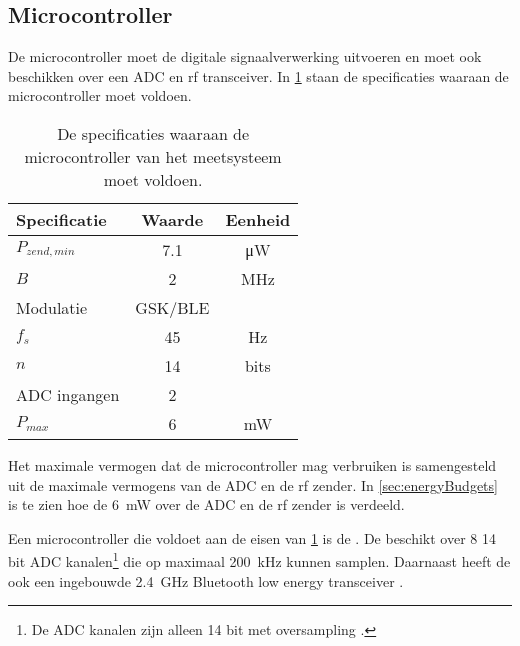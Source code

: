 \subsection{Microcontroller}
De microcontroller moet de digitale signaalverwerking uitvoeren en moet ook beschikken over een ADC en rf transceiver. In \cref{tab:specMCU} staan de specificaties waaraan de microcontroller moet voldoen.
\begin{table}[!htbp]
    \centering
    \begin{tabular}{l|c|c}
        Specificatie    & Waarde    & Eenheid \\\hline
        $P_{zend,min}$  & 7.1       & \si{\micro\watt}  \\
        $B$             & 2         & \si{\mega\hertz}  \\
        Modulatie       & GSK/BLE   &                   \\\hline
        $f_s$           & 45        & \si{\hertz}       \\
        $n$             & 14        & bits              \\
        ADC ingangen    & 2         &                   \\\hline
        $P_{max}$       & 6         & \si{\milli\watt}
    \end{tabular}
    \caption{De specificaties waaraan de microcontroller van het \si{\pH} meetsysteem moet voldoen.}
    \label{tab:specMCU}
\end{table}
Het maximale vermogen dat de microcontroller mag verbruiken is samengesteld uit de maximale vermogens van de ADC en de rf zender. In \cref{sec:energyBudgets} is te zien hoe de \qty{6}{\milli\watt} over de ADC en de rf zender is verdeeld.


Een microcontroller die voldoet aan de eisen van \cref{tab:specMCU} is de \mcu. De \mcu beschikt over 8 14 bit ADC kanalen\footnote{De ADC kanalen zijn alleen 14 bit met oversampling \cite{nrf52810}.} die op maximaal \qty{200}{\kilo\hertz} kunnen samplen. Daarnaast heeft de \mcu ook een ingebouwde \qty{2.4}{\giga\hertz} Bluetooth low energy transceiver \cite{nrf52810}.

